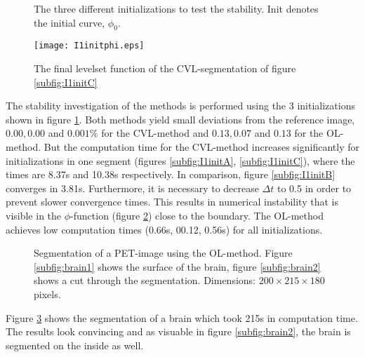 \begin{figure}[h]
  \centering
  \caption{The three different initializations to test the stability. Init denotes the initial curve, $\phi_0$.}\label{I1init}
\end{figure}

\begin{figure}[h]
  \centering
  \texttt{[image: I1initphi.eps]}
  \caption{The final levelset function of the CVL-segmentation of figure \ref{subfig:I1initC}}\label{I1initphi}
\end{figure}


The stability investigation of the methods is performed using the 3 initializations shown in figure \ref{I1init}. Both methods yield small deviations from the reference image, $0.00, 0.00$ and $0.001\%$ for the CVL-method and $0.13, 0.07$ and $0.13$ for the OL-method. But the computation time for the CVL-method increases significantly for initializations in one segment (figures \ref{subfig:I1initA}, \ref{subfig:I1initC}), where the times are 8.37s and 10.38s respectively. In comparison, figure \ref{subfig:I1initB} converges in 3.81s. Furthermore, it is necessary to decrease $\Delta t$ to 0.5 in order to prevent slower convergence times. This results in numerical instability that is visible in the $\phi$-function (figure \ref{I1initphi}) close to the boundary. The OL-method achieves low computation times (0.66s, 00.12, 0.56s) for all initializations.

\begin{figure}[h]
  \centering
  \caption{Segmentation of a PET-image using the OL-method. Figure \ref{subfig:brain1} shows the surface of the brain, figure \ref{subfig:brain2} shows a cut through the segmentation. Dimensions: $200\times 215\times 180$ pixels.}\label{fig:brain}
\end{figure}

Figure \ref{fig:brain} shows the segmentation of a brain which took 215s in computation time. The results look convincing and as visuable in figure \ref{subfig:brain2}, the brain is segmented on the inside as well.

